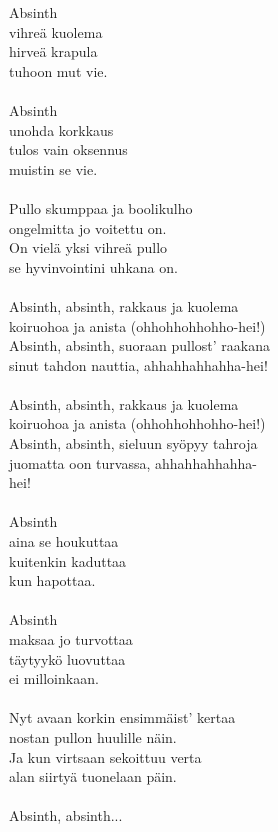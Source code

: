 
Absinth \\ vihreä kuolema \\ hirveä krapula \\ tuhoon mut vie. \\ \hspace{10mm} \\ Absinth \\ unohda korkkaus \\ tulos vain oksennus \\ muistin se vie. \\ \hspace{10mm} \\ Pullo skumppaa ja boolikulho \\ ongelmitta jo voitettu on. \\ On vielä yksi vihreä pullo \\ se hyvinvointini uhkana on. \\ \hspace{10mm} \\ Absinth, absinth, rakkaus ja kuolema \\ koiruohoa ja anista (ohhohhohhohho-hei!) \\ Absinth, absinth, suoraan pullost' raakana \\ sinut tahdon nauttia, ahhahhahhahha-hei! \\ \hspace{10mm} \\ Absinth, absinth, rakkaus ja kuolema \\ koiruohoa ja anista (ohhohhohhohho-hei!) \\ Absinth, absinth, sieluun syöpyy tahroja \\ juomatta oon turvassa, ahhahhahhahha- \\ hei! \\ \hspace{10mm} \\ Absinth \\ aina se houkuttaa \\ kuitenkin kaduttaa \\ kun hapottaa. \\ \hspace{10mm} \\ Absinth \\ maksaa jo turvottaa \\ täytyykö luovuttaa \\ ei milloinkaan. \\ \hspace{10mm} \\ Nyt avaan korkin ensimmäist' kertaa \\ nostan pullon huulille näin. \\ Ja kun virtsaan sekoittuu verta \\ alan siirtyä tuonelaan päin. \\ \hspace{10mm} \\ Absinth, absinth...